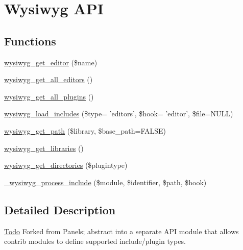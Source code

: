 \hypertarget{group__wysiwyg__api}{
\section{Wysiwyg API}
\label{group__wysiwyg__api}
}
\subsection*{Functions}
\begin{DoxyCompactItemize}
\item 
\hyperlink{group__wysiwyg__api_gaf5c3c86f49f33be930fa6f9b5405a2a6}{wysiwyg\_\-get\_\-editor} (\$name)
\item 
\hyperlink{group__wysiwyg__api_gaf92d888d31e7e1adc2b7d8e763f62b33}{wysiwyg\_\-get\_\-all\_\-editors} ()
\item 
\hyperlink{group__wysiwyg__api_ga4b254b0ad93a619180087364bc415cde}{wysiwyg\_\-get\_\-all\_\-plugins} ()
\item 
\hyperlink{group__wysiwyg__api_gae5880da976120e85f7bb8aeda815b060}{wysiwyg\_\-load\_\-includes} (\$type= 'editors', \$hook= 'editor', \$file=NULL)
\item 
\hyperlink{group__wysiwyg__api_ga328c8919e7a4bb96cf7a19f098313319}{wysiwyg\_\-get\_\-path} (\$library, \$base\_\-path=FALSE)
\item 
\hyperlink{group__wysiwyg__api_ga2918aa22fa830564c63c0df96a625379}{wysiwyg\_\-get\_\-libraries} ()
\item 
\hyperlink{group__wysiwyg__api_ga47660e98db185a3c9de431b94e280977}{wysiwyg\_\-get\_\-directories} (\$plugintype)
\item 
\hyperlink{group__wysiwyg__api_ga81487ce9ea49d7ca7b052bb8f2e8fcc8}{\_\-wysiwyg\_\-process\_\-include} (\$module, \$identifier, \$path, \$hook)
\end{DoxyCompactItemize}


\subsection{Detailed Description}
\begin{Desc}
\item[\hyperlink{todo__todo000066}{Todo}]Forked from Panels; abstract into a separate API module that allows contrib modules to define supported include/plugin types. \end{Desc}


